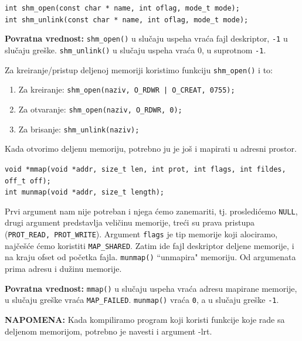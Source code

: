 \documentclass[a4paper, 11pt]{article}
\begin{document}
\begin{center}
	\texttt{int shm\_open(const char * name, int oflag, mode\_t mode);} \\
	\texttt{int shm\_unlink(const char * name, int oflag, mode\_t mode);}
\end{center}
\textbf{Povratna vrednost:} \texttt{shm\_open()} u slučaju uspeha vraća fajl deskriptor, \texttt{-1} u slučaju greške. \texttt{shm\_unlink()} u slučaju uspeha vraća 0, u suprotnom \texttt{-1}.

Za kreiranje/pristup deljenoj memoriji koristimo funkciju \texttt{shm\_open()} i to: 
\vspace{-2mm} 
\begin{enumerate}[1)]
	\item{Za kreiranje: \texttt{shm\_open(naziv, O\_RDWR | O\_CREAT, 0755);}}
	\item{Za otvaranje: \texttt{shm\_open(naziv, O\_RDWR, 0);}}
	\item{Za brisanje: \texttt{shm\_unlink(naziv);}}
\end{enumerate}
\vspace{-1mm} 

Kada otvorimo deljenu memoriju, potrebno ju je još i mapirati u adresni prostor.

\begin{center}
	\texttt{void *mmap(void *addr, size\_t len, int prot, int flags, int fildes, off\_t off);} \\
	\texttt{int munmap(void *addr, size\_t length);}
\end{center}

Prvi argument nam nije potreban i njega ćemo zanemariti, tj. prosledićemo \texttt{NULL}, drugi argument predstavlja veličinu memorije, treći su prava pristupa (\texttt{PROT\_READ, PROT\_WRITE}). Argument \texttt{flags} je tip memorije koji alociramo, najčešće ćemo koristiti \texttt{MAP\_SHARED}. Zatim ide fajl deskriptor deljene memorije, i na kraju ofset od početka fajla. \texttt{munmap()} ``unmapira" memoriju. Od argumenata prima adresu i dužinu memorije. 

\textbf{Povratna vrednost:} \texttt{mmap()} u slučaju uspeha vraća adresu mapirane memorije, u slučaju greške vraća \texttt{MAP\_FAILED}. \texttt{munmap()} vraća \texttt{0}, a u slučaju greške \texttt{-1}.

\vspace{2mm} 
\textbf{NAPOMENA:} Kada kompiliramo program koji koristi funkcije koje rade sa deljenom memorijom, potrebno je navesti i argument -lrt. 
\end{document}
